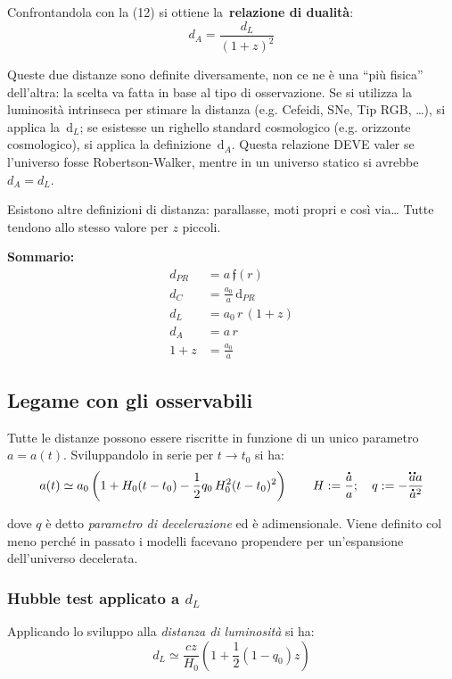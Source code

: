 Confrontandola con la (12) si ottiene la~\textbf{relazione di dualità}:
\begin{equation}
d_A=\frac{d_L}{(1+z)^2}
\end{equation}

Queste due distanze sono definite diversamente, non ce ne è una ``più
fisica'' dell'altra: la scelta va fatta in base al tipo di osservazione.
Se si utilizza la luminosità intrinseca per
stimare la distanza (e.g. Cefeidi, SNe, Tip RGB, \ldots{}), si applica la~\(\mathrm{d}_L\); se
esistesse un righello standard cosmologico (e.g. orizzonte cosmologico),
si applica la definizione~\(\mathrm{d}_A\). Questa relazione DEVE
valer se l'universo fosse Robertson-Walker, mentre in un universo
statico si avrebbe~\(d_A=d_L\).~

Esistono altre definizioni di distanza: parallasse, moti propri e così
via\ldots{} Tutte tendono allo stesso valore per \(z\)
piccoli.

\par\null
\begin{definition}
  \textbf{Sommario:}
\begin{align*}
  d_{PR} & =a\,\mathfrak{f}(r)  \\ 
  d_{C} & =\frac{a_0}{a}\,\mathrm{d}_{PR}  \\ 
  d_L & = a_0 \, r\, (1+z)  \\ 
  d_A & =a\, r  \\
  1+z & =\frac{a_0}{a}
  \end{align*}
\end{definition}

\subsection{Legame con gli osservabili}

Tutte le distanze possono essere riscritte in funzione di un unico
parametro $a=a(t)$. Sviluppandolo in serie per $t\to t_0$ si ha:
\begin{equation}
a(t)\simeq a_0\left ( 1+H_0 (t-t_0)-\frac{1}{2}q_0\,H_0^2(t-t_0)^2  \right )\qquad 
H:=\frac{\accentset{\mbox{\large\bfseries .}}{a}}{a}; \quad
q:=-\frac{\accentset{\mbox{\large\bfseries ..}}{a} a}{\accentset{\mbox{\large\bfseries .}}{a}^2} 
\end{equation}

dove $q$ è detto \emph{parametro di decelerazione} ed è adimensionale. Viene definito col meno perché in passato i modelli facevano propendere per un'espansione dell'universo decelerata. 

\subsubsection{Hubble test applicato a $d_L$}
Applicando lo sviluppo alla \emph{distanza di luminosità} si ha:
\begin{equation}
d_L\simeq \frac{cz}{H_0}\left ( 1 + \frac{1}{2}(1-q_0)z  \right )
\end{equation}

